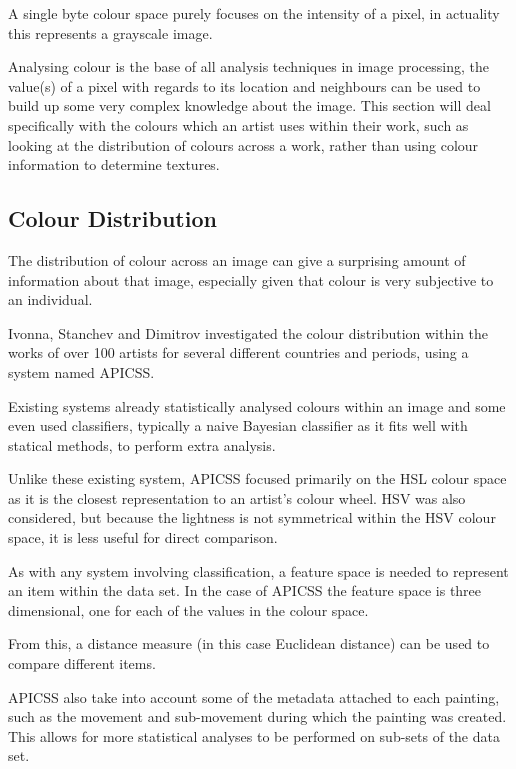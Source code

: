 \documentclass[conference]{IEEEtran}
\begin{document}
A single byte colour space purely focuses on the intensity of a pixel, in
actuality this represents a grayscale image.

Analysing colour is the base of all analysis techniques in image processing,
the value(s) of a pixel with regards to its location and neighbours can be used
to build up some very complex knowledge about the image. This section will deal
specifically with the colours which an artist uses within their work, such as
looking at the distribution of colours across a work, rather than using colour
information to determine textures.

\subsection{Colour Distribution}

The distribution of colour across an image can give a surprising amount of
information about that image, especially given that colour is very subjective
to an individual.

Ivonna, Stanchev and Dimitrov investigated the colour
distribution within the works of over 100 artists for several different
countries and periods, using a system named \gls{APICSS}\cite{ivanova2008analysis}.

Existing systems already statistically analysed colours within an image and
some even used classifiers, typically a naive Bayesian classifier as it fits
well with statical methods, to perform extra analysis.

Unlike these existing system, \gls{APICSS} focused primarily on the \gls{HSL}
colour space as it is the closest representation to an artist's colour wheel.
\gls{HSV} was also considered, but because the lightness is not symmetrical
within the \gls{HSV} colour space, it is less useful for direct comparison.

As with any system involving classification, a feature space is needed to
represent an item within the data set. In the case of \gls{APICSS} the feature
space is three dimensional, one for each of the values in the colour space.

From this, a distance measure (in this case Euclidean distance) can be used to
compare different items.

\gls{APICSS} also take into account some of the metadata attached to each
painting, such as the movement and sub-movement during which the painting was
created. This allows for more statistical analyses to be performed on sub-sets
of the data set.
\end{document}
